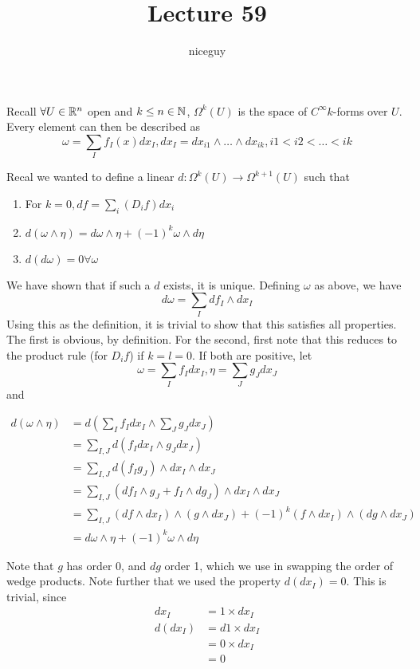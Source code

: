 \documentclass[12pt]{article}
\title{Lecture 59}
\author{niceguy}
\begin{document}
\maketitle

Recall $\forall U \in \mathbb{R}^n$ open and $k \le n \in \mathbb{N}$, $\Omega^k(U)$ is the space of $C^\infty k$-forms over $U$. Every element can then be described as
$$\omega = \sum_I f_I(x)dx_I, dx_I = dx_{i1} \wedge \dots \wedge dx_{ik}, i1 < i2 < \dots < ik$$

Recal we wanted to define a linear $d:\Omega^k(U) \rightarrow \Omega^{k+1}(U)$ such that

\begin{enumerate}
    \item For $k=0, df = \sum_i (D_if)dx_i$
    \item $d(\omega \wedge \eta) = d\omega \wedge \eta + (-1)^k\omega \wedge d\eta$
    \item $d(d\omega) = 0 \forall \omega$
\end{enumerate}

We have shown that if such a $d$ exists, it is unique. Defining $\omega$ as above, we have
$$d\omega = \sum_I df_I \wedge dx_I$$
Using this as the definition, it is trivial to show that this satisfies all properties. The first is obvious, by definition. For the second, first note that this reduces to the product rule (for $D_if$) if $k = l = 0$. If both are positive, let
$$\omega = \sum_I f_Idx_I, \eta = \sum_J g_Jdx_J$$
and

\begin{align*}
    d(\omega \wedge \eta) &= d\left(\sum_I f_Idx_I \wedge \sum_J g_Jdx_J\right) \\
                          &= \sum_{I,J} d(f_Idx_I \wedge g_Jdx_J) \\
                          &= \sum_{I,J} d(f_Ig_J) \wedge dx_I \wedge dx_J \\
                          &= \sum_{I,J} (df_I \wedge g_J + f_I \wedge dg_J) \wedge dx_I \wedge dx_J \\
                          &= \sum_{I,J} (df \wedge dx_I) \wedge (g \wedge dx_J) + (-1)^k(f \wedge dx_I) \wedge (dg \wedge dx_J) \\
                          &= d\omega \wedge \eta + (-1)^k\omega \wedge d\eta
\end{align*}

Note that $g$ has order 0, and $dg$ order 1, which we use in swapping the order of wedge products. Note further that we used the property $d(dx_I) = 0$. This is trivial, since
\begin{align*}
    dx_I &= 1 \times dx_I \\
    d(dx_I) &= d1 \times dx_I \\
            &= 0 \times dx_I \\
            &= 0
\end{align*}
\end{document}
